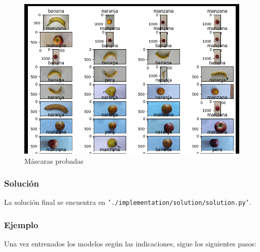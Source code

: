 \documentclass[a4paper, 12pt]{article}
\begin{document}
\begin{figure}[!htbp]
    \centering
    \includegraphics[width=\linewidth]{VALIDACION_IMAGEN.PNG}
    \caption{Máscaras probadas}
    \label{validacion_imagen}
\end{figure}

\subsubsection{Solución}

La solución final se encuentra en \texttt{'./implementation/solution/solution.py'}.

\subsubsection{Ejemplo}

Una vez entrenados los modelos según las indicaciones, sigue los siguientes pasos:
\end{document}
